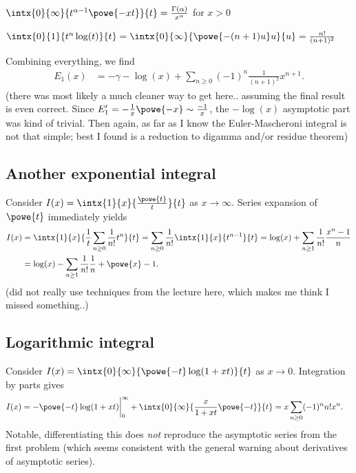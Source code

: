 \documentclass[english, parskip=full]{scrartcl}
\newcommand{\note}[1]{\begin{tcolorbox}[colback=colorbackgroundnote,colframe=colornote, breakable,enhanced]#1\end{tcolorbox}}
\begin{document}
\note{$\intx{0}{\infty}{t^{\alpha-1} \powe{-xt}}{t} = \frac{\Gamma(\alpha)}{x^\alpha}$ for $x>0$}
\note{$\intx{0}{1}{t^n \log(t)}{t} = \intx{0}{\infty}{\powe{-(n+1)u} u}{u} = \frac{n!}{(n+1)^2}$}
Combining everything, we find
\begin{align}
E_1(x) &= -\gamma - \log(x) + \sum_{n\ge 0} (-1)^n \frac{1}{(n+1)^2} x^{n+1}.
\end{align}
(there was most likely a much cleaner way to get here.. assuming the final result is even correct. Since $E_1' = -\frac{1}{x}\powe{-x} \sim \frac{-1}{x}$, the $-\log(x)$ asymptotic part was kind of trivial. Then again, as far as I know the Euler-Mascheroni integral is not that simple; best I found is a reduction to digamma and/or residue theorem)
\subsection{Another exponential integral}
Consider $I(x) = \intx{1}{x}{\frac{\powe{t}}{t}}{t}$ as $x\rightarrow\infty$.
Series expansion of $\powe{t}$ immediately yields
\begin{align}
I(x) &= \intx{1}{x}{\frac{1}{t} \sum_{n\ge 0} \frac{1}{n!} t^n}{t} = \sum_{n\ge 0} \frac{1}{n!} \intx{1}{x}{t^{n-1}}{t} = \log(x) + \sum_{n\ge 1} \frac{1}{n!} \frac{x^n-1}{n}\\
&= \log(x) - \sum_{n\ge 1} \frac{1}{n!} \frac{1}{n} + \powe{x}-1.
\end{align}
(did not really use techniques from the lecture here, which makes me think I missed something..)
\subsection{Logarithmic integral}
Consider $I(x) = \intx{0}{\infty}{\powe{-t} \log(1+xt)}{t}$ as $x\rightarrow 0$.
Integration by parts gives
\begin{align}
I(x) &= -\powe{-t}\log(1+xt)\bigg\vert_0^\infty + \intx{0}{\infty}{\frac{x}{1+xt} \powe{-t}}{t} = x \sum_{n\ge 0} (-1)^n n! x^n.
\end{align}
Notable, differentiating this does \emph{not} reproduce the asymptotic series from the first problem (which seems consistent with the general warning about derivatives of asymptotic series).
\end{document}
